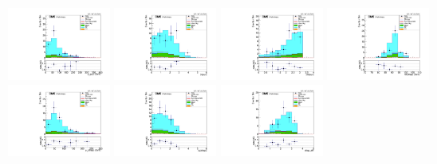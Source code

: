 \begin{figure}[!htb]
  \centering
  \captionsetup{justification=justified}
  \includegraphics[width=0.24\textwidth]{pics/VH_sec/valid_BDT_ZH/dimu_pt.pdf}
  \includegraphics[width=0.24\textwidth]{pics/VH_sec/valid_BDT_ZH/dimu_abs_eta.pdf}
  \includegraphics[width=0.24\textwidth]{pics/VH_sec/valid_BDT_ZH/dimu_abs_dPhi.pdf}
  \includegraphics[width=0.24\textwidth]{pics/VH_sec/valid_BDT_ZH/dilep_mass.pdf}
  \includegraphics[width=0.24\textwidth]{pics/VH_sec/valid_BDT_ZH/dilep_pt.pdf}
  \includegraphics[width=0.24\textwidth]{pics/VH_sec/valid_BDT_ZH/dilep_abs_eta.pdf}
  \includegraphics[width=0.24\textwidth]{pics/VH_sec/valid_BDT_ZH/dilep_dR.pdf}

\end{figure}
